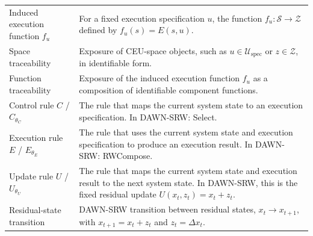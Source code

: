 \documentclass{article}
\begin{document}
\begin{minipage}{\textwidth}
\begin{center}
\begin{tabularx}{\textwidth}{lX}
Induced execution function \(f_u\) & For a fixed execution specification \(u\), the function \(f_u:\mathcal{S}\to\mathcal{Z}\) defined by \(f_u(s)=E(s,u)\). \\
Space traceability & Exposure of CEU-space objects, such as \(u\in\mathcal{U}_{\mathrm{spec}}\) or \(z\in\mathcal{Z}\), in identifiable form. \\
Function traceability & Exposure of the induced execution function \(f_u\) as a composition of identifiable component functions. \\
Control rule \(C\) / \(C_{\theta_C}\) & The rule that maps the current system state to an execution specification. In DAWN-SRW: Select. \\
Execution rule \(E\) / \(E_{\theta_E}\) & The rule that uses the current system state and execution specification to produce an execution result. In DAWN-SRW: RWCompose. \\
Update rule \(U\) / \(U_{\theta_U}\) & The rule that maps the current system state and execution result to the next system state. In DAWN-SRW, this is the fixed residual update \(U(x_t,z_t)=x_t+z_t\). \\
Residual-state transition & DAWN-SRW transition between residual states, \(x_t\to x_{t+1}\), with \(x_{t+1}=x_t+z_t\) and \(z_t=\Delta x_t\). \\
\bottomrule
\end{tabularx}
\end{center}
\end{minipage}
\par\medskip
\end{document}
